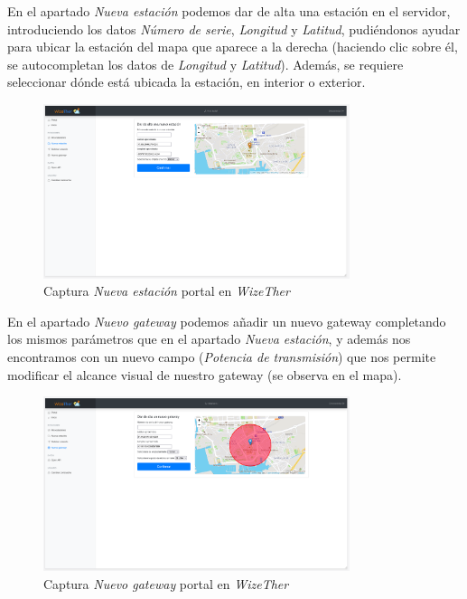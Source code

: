 \documentclass[12pt]{article}
\begin{document}
\pagebreak

\noindent En el apartado \textit{Nueva estación} podemos dar de alta una estación en el servidor, introduciendo los datos \textit{Número de serie}, \textit{Longitud} y \textit{Latitud}, pudiéndonos ayudar para ubicar la estación del mapa que aparece a la derecha (haciendo clic sobre él, se autocompletan los datos de \textit{Longitud} y \textit{Latitud}). Además, se requiere seleccionar dónde está ubicada la estación, en interior o exterior.

\begin{figure}[h]
	\begin{center}
		\includegraphics[width=0.8\textwidth]{img_rani/nueva_estacion.png}
		\caption{Captura \textit{Nueva estación} portal en \textit{WizeTher}}
	\end{center}
\end{figure}

\pagebreak

\noindent

\noindent En el apartado \textit{Nuevo gateway} podemos añadir un nuevo gateway completando los mismos parámetros que en el apartado \textit{Nueva estación}, y además nos encontramos con un nuevo campo (\textit{Potencia de transmisión}) que nos permite modificar el alcance visual de nuestro gateway  (se observa en el mapa).

\begin{figure}[h]
	\begin{center}
		\includegraphics[width=0.8\textwidth]{img_rani/nuevo_gateway.png}
		\caption{Captura \textit{Nuevo gateway} portal en \textit{WizeTher}}
	\end{center}
\end{figure}
\end{document}
